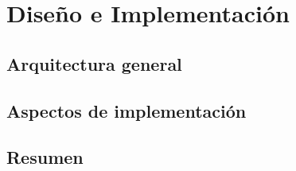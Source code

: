 \chapter{Diseño e Implementación}


\section{Arquitectura general}

\section{Aspectos de implementación}


\section{Resumen}
